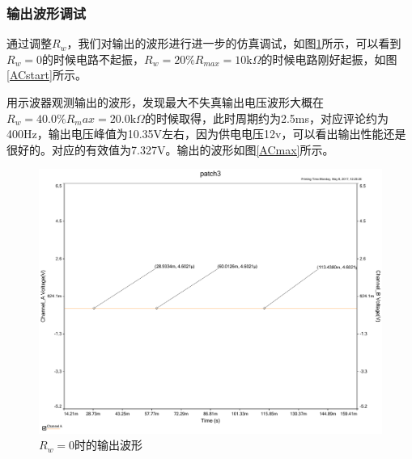 \documentclass[UTF8,a4paper]{paper}
\begin{document}
\subsubsection{输出波形调试}
\begin{multicols}{2}
通过调整$R_w$，我们对输出的波形进行进一步的仿真调试，如图\ref{AC0}所示，可以看到$R_w=0$的时候电路不起振，$R_w=20\%R_{max}=10\mathrm{k}\Omega$的时候电路刚好起振，如图\ref{ACstart}所示。

用示波器观测输出的波形，发现最大不失真输出电压波形大概在$R_w=40.0\%R_max=20.0\mathrm{k}\Omega$的时候取得，此时周期约为2.5ms，对应评论约为400Hz，输出电压峰值为10.35V左右，因为供电电压12v，可以看出输出性能还是很好的。对应的有效值为7.327V。输出的波形如图\ref{ACmax}所示。
\begin {figure}[H]
\includegraphics [width=\columnwidth]{0ac.pdf}
\caption{$R_w=0$时的输出波形}
\label{AC0}
\end {figure}
\end{multicols}
\end{document}
